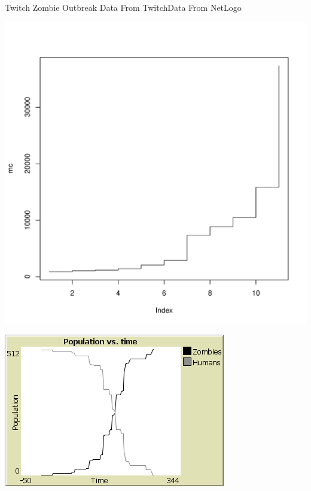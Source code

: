 \documentclass{beamer}
\begin{document}
\begin{frame}{Twitch Zombie Outbreak}
Data From Twitch\hspace{2.5cm}Data From NetLogo
\begin{minipage}{0.5\textwidth}
\includegraphics[scale=0.3]{Rplots}
\end{minipage}
\begin{minipage}{0.4\textwidth}
\includegraphics[scale=0.6]{zombie_exponential}
\end{minipage}
\end{frame}
\end{document}
